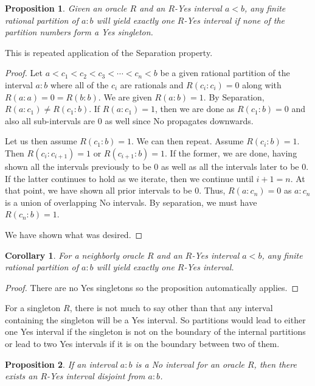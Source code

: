 \documentclass[12pt]{article}
\newtheorem{corollary}{Corollary}[subsection]
\newtheorem{proposition}{Proposition}[subsection]
\begin{document}
\begin{proposition}\label{pr:multi}
Given an oracle $R$ and an $R$-Yes interval $a\lt b$, any finite rational partition of $a:b$ will yield exactly one $R$-Yes interval if none of the partition numbers form a Yes singleton. 
\end{proposition}

This is repeated application of the Separation property. 

\begin{proof}
Let $a < c_1 < c_2 < c_3 < \cdots < c_n < b$ be a given rational partition of the interval $a:b$ where all of the $c_i$ are rationals and $R(c_i:c_i) = 0$ along with $R(a:a) = 0 = R(b:b)$. We are given $R(a:b) = 1$. By Separation, $R(a:c_1) \neq R(c_1:b)$. If $R(a:c_1)=1$, then we are done as $R(c_1:b)=0$ and also all sub-intervals are 0 as well since No propagates downwards. 

Let us then assume $R(c_1:b)=1$. We can then repeat. Assume $R(c_i:b)=1$. Then $R(c_i:c_{i+1})=1$ or $R(c_{i+1}:b)=1$. If the former, we are done, having shown all the intervals previously to be 0 as well as all the intervals later to be 0.  If the latter continues to hold as we iterate, then we continue until $i+1 = n$. At that point, we have shown all prior intervals to be 0. Thus, $R(a:c_n)=0$ as $a:c_{n}$ is a union of overlapping No intervals. By separation, we must have $R(c_n:b) = 1$. 

We have shown what was desired. 
\end{proof}

\begin{corollary}
    For a neighborly oracle $R$ and an $R$-Yes interval $a\lt b$, any finite rational partition of $a:b$ will yield exactly one $R$-Yes interval. 
\end{corollary}

\begin{proof}
    There are no Yes singletons so the proposition automatically applies. 
\end{proof}

For a singleton $R$, there is not much to say other than that any interval containing the singleton will be a Yes interval. So partitions would lead to either one Yes interval if the singleton is not on the boundary of the internal partitions or lead to two Yes intervals if it is on the boundary between two of them. 

\begin{proposition}\label{pr:no-is-disjoint}
    If an interval $a:b$ is a No interval for an oracle $R$, then there exists an $R$-Yes interval disjoint from $a:b$.
\end{proposition}
\end{document}
